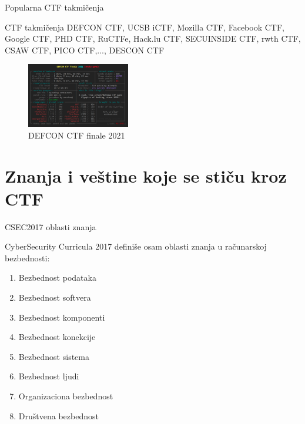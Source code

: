 \documentclass[aspectratio=169,xcolor=dvipsnames]{beamer}
\begin{document}

\begin{frame}{Popularna CTF takmičenja}

    \begin{exampleblock}{CTF takmičenja}
        DEFCON CTF, UCSB iCTF, Mozilla CTF, Facebook CTF, Google CTF, PHD CTF, 
        RuCTFe, Hack.lu CTF, SECUINSIDE CTF, rwth CTF, CSAW CTF, PICO CTF,...,
        DESCON CTF \cite{ctftime} \cite{ctfdescon}
    \end{exampleblock}

    \begin{figure}
        \begin{center}
            \includegraphics[width=0.4\textwidth]{Slike/ctf_comp.png}
        \end{center}
        \caption{DEFCON CTF finale 2021}
    \end{figure}

\end{frame}

\section{Znanja i veštine koje se stiču kroz CTF}

\begin{frame}{CSEC2017 oblasti znanja}
    \begin{block}{CyberSecurity Curricula 2017}
        \cite{ctfcsec17} definiše osam oblasti znanja u računarskoj bezbednosti:
        \begin{enumerate}
            \item Bezbednost podataka
            \item Bezbednost softvera 
            \item Bezbednost komponenti
            \item Bezbednost konekcije
            \item Bezbednost sistema
            \item Bezbednost ljudi
            \item Organizaciona bezbednost
            \item Društvena bezbednost
        \end{enumerate}
    \end{block}
\end{frame}
\end{document}
